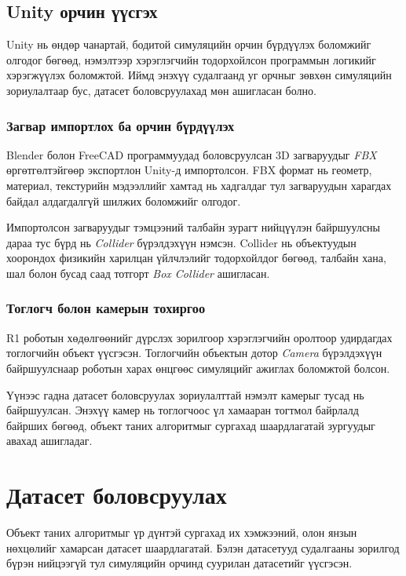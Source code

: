 \subsection{Unity орчин үүсгэх}

Unity нь өндөр чанартай, бодитой симуляцийн орчин бүрдүүлэх боломжийг олгодог бөгөөд, нэмэлтээр хэрэглэгчийн тодорхойлсон программын логикийг хэрэгжүүлэх боломжтой. Иймд энэхүү судалгаанд уг орчныг зөвхөн симуляцийн зориулалтаар бус, датасет боловсруулахад мөн ашигласан болно.

\subsubsection{Загвар импортлох ба орчин бүрдүүлэх}

Blender болон FreeCAD программуудад боловсруулсан 3D загваруудыг \textit{FBX} өргөтгөлтэйгөөр экспортлон Unity-д импортолсон. FBX формат нь геометр, материал, текстурийн мэдээллийг хамтад нь хадгалдаг тул загваруудын харагдах байдал алдагдалгүй шилжих боломжийг олгодог.

Импортолсон загваруудыг тэмцээний талбайн зурагт нийцүүлэн байршуулсны дараа тус бүрд нь \textit{Collider} бүрэлдэхүүн нэмсэн. Collider нь объектуудын хоорондох физикийн харилцан үйлчлэлийг тодорхойлдог бөгөөд, талбайн хана, шал болон бусад саад тотгорт \textit{Box Collider} ашигласан.

\subsubsection{Тоглогч болон камерын тохиргоо}

R1 роботын хөдөлгөөнийг дүрслэх зорилгоор хэрэглэгчийн оролтоор удирдагдах тоглогчийн объект үүсгэсэн. Тоглогчийн объектын дотор \textit{Camera} бүрэлдэхүүн байршуулснаар роботын харах өнцгөөс симуляцийг ажиглах боломжтой болсон.

Үүнээс гадна датасет боловсруулах зориулалттай нэмэлт камерыг тусад нь байршуулсан. Энэхүү камер нь тоглогчоос үл хамааран тогтмол байрлалд байрших бөгөөд, объект таних алгоритмыг сургахад шаардлагатай зургуудыг авахад ашигладаг.

\section{Датасет боловсруулах}

Объект таних алгоритмыг үр дүнтэй сургахад их хэмжээний, олон янзын нөхцөлийг хамарсан датасет шаардлагатай. Бэлэн датасетууд судалгааны зорилгод бүрэн нийцээгүй тул симуляцийн орчинд суурилан датасетийг үүсгэсэн.

